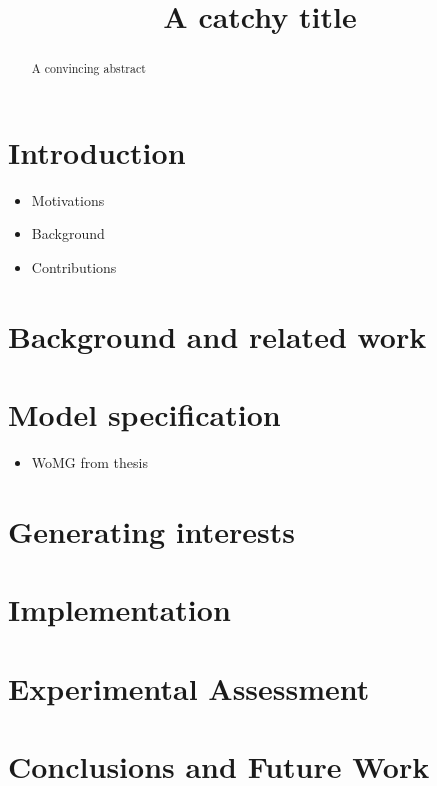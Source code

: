 \documentclass[sigconf,anonymous=true,draft]{acmart}
\begin{document}
\title{A catchy title}

\begin{abstract}
A convincing abstract
\end{abstract}
\maketitle \sloppy

\section{Introduction}
\label{sec:intro}


\begin{itemize}
  \item Motivations
  \item Background
  \item Contributions
\end{itemize}

\section{Background and related work}
\label{sec:related}


\section{Model specification}
\label{sec:model}


\begin{itemize}
  \item WoMG from thesis
\end{itemize}

\section{Generating interests}
\label{sec:interests}


\section{Implementation}
\label{sec:implementation}


\section{Experimental Assessment}
\label{sec:experiments}


\section{Conclusions and Future Work}
\label{sec:conclusions}




\end{document}
